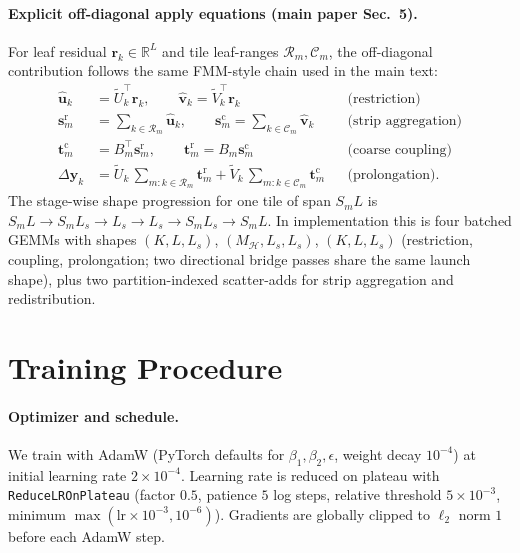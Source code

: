 \documentclass[acmtog,anonymous,review]{acmart}
\begin{document}
\paragraph{Explicit off-diagonal apply equations (main paper Sec.~5).}
For leaf residual $\mathbf{r}_k\!\in\!\mathbb{R}^{L}$ and tile leaf-ranges
$\mathcal{R}_m,\mathcal{C}_m$, the off-diagonal contribution follows the same
FMM-style chain used in the main text:
\begin{align}
  \hat{\mathbf{u}}_k &= \tilde U_k^\top\mathbf{r}_k,\qquad
  \hat{\mathbf{v}}_k = \tilde V_k^\top\mathbf{r}_k && \text{(restriction)} \\
  \mathbf{s}^{\mathrm{r}}_m &= \sum_{k\in\mathcal{R}_m}\hat{\mathbf{u}}_k,\qquad
  \mathbf{s}^{\mathrm{c}}_m = \sum_{k\in\mathcal{C}_m}\hat{\mathbf{v}}_k
  && \text{(strip aggregation)} \\
  \mathbf{t}^{\mathrm{c}}_m &= B_m^\top\mathbf{s}^{\mathrm{r}}_m,\qquad
  \mathbf{t}^{\mathrm{r}}_m = B_m\mathbf{s}^{\mathrm{c}}_m && \text{(coarse coupling)} \\
  \Delta\mathbf{y}_k &= \tilde U_k\,{\textstyle\sum_{m:k\in\mathcal{R}_m}\!\mathbf{t}^{\mathrm{r}}_m}
                    +  \tilde V_k\,{\textstyle\sum_{m:k\in\mathcal{C}_m}\!\mathbf{t}^{\mathrm{c}}_m}
  && \text{(prolongation).}
\end{align}
The stage-wise shape progression for one tile of span $S_mL$ is
$S_mL \rightarrow S_mL_s \rightarrow L_s \rightarrow L_s \rightarrow S_mL_s \rightarrow S_mL$.
In implementation this is four batched GEMMs with shapes
$(K,L,L_s)$, $(M_{\mathcal{H}},L_s,L_s)$, $(K,L,L_s)$ (restriction, coupling,
prolongation; two directional bridge passes share the same launch shape), plus two
partition-indexed scatter-adds for strip aggregation and redistribution.

\section{Training Procedure}
\label{supp:training}

\paragraph{Optimizer and schedule.}
We train with AdamW (PyTorch defaults for $\beta_1,\beta_2,\epsilon$,
weight decay $10^{-4}$) at initial learning rate $2\!\times\!10^{-4}$. Learning
rate is reduced on plateau with \texttt{ReduceLROnPlateau} (factor $0.5$,
patience $5$ log steps, relative threshold $5\!\times\!10^{-3}$, minimum
$\max(\mathrm{lr}\!\times\!10^{-3}, 10^{-6})$). Gradients are globally clipped to
$\ell_2$ norm $1$ before each AdamW step.
\end{document}
